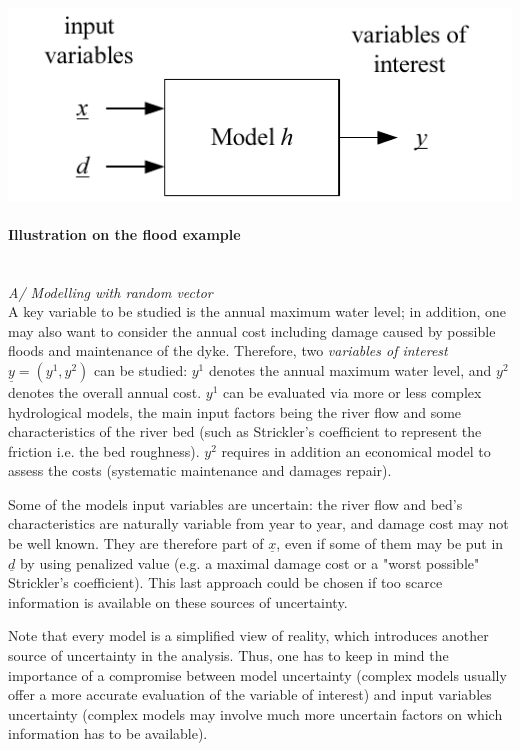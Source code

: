 \begin{center}
  \includegraphics[scale=0.8]{Figures/flow.pdf}
\end{center}

\paragraph{Illustration on the flood example}
\strut\\
%
\textit{A/ Modelling with random vector}\\
A key variable to be studied is the annual maximum water level; in addition, one may also want to consider the annual cost including damage caused by possible floods and  maintenance of the dyke. Therefore, two {\em variables of interest} $\underline{y} = \left( y^1,y^2 \right)$ can be studied: $y^1$ denotes the annual maximum water level, and $y^2$ denotes the overall annual cost. $y^1$ can be evaluated via more or less complex hydrological models, the main input factors being the river flow and some characteristics of the river bed (such as Strickler's coefficient to represent the friction i.e. the bed roughness). $y^2$ requires in addition an economical model to assess the costs (systematic maintenance and damages repair).

Some of the models input variables are uncertain: the river flow and bed's characteristics are naturally variable from year to year, and damage cost may not be well known. They are therefore part of $\underline{x}$, even if some of them may be put in $\underline{d}$ by using penalized value (e.g. a maximal damage cost or a "worst possible" Strickler's coefficient). This last approach could be chosen if too scarce information is available on these sources of uncertainty.

Note that every model is a simplified view of reality, which introduces another source of uncertainty in the analysis. Thus, one has to keep in mind the importance of a compromise between model uncertainty (complex models usually offer a more accurate evaluation of the variable of interest) and input variables uncertainty (complex models may involve much more uncertain factors on which information has to be available).\\

